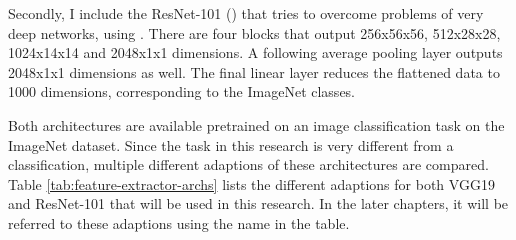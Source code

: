 Secondly, I include the ResNet-101 (\cite{He2016}) that tries to overcome problems of very deep networks, using .
There are four blocks that output 256x56x56, 512x28x28, 1024x14x14 and 2048x1x1 dimensions.
A following average pooling layer outputs 2048x1x1 dimensions as well.
The final linear layer reduces the flattened data to 1000 dimensions, corresponding to the ImageNet classes.

Both architectures are available pretrained on an image classification task on the ImageNet dataset.
Since the task in this research is very different from a classification, multiple different adaptions of these architectures are compared. 
Table \ref*{tab:feature-extractor-archs} lists the different adaptions for both VGG19 and ResNet-101 that will be used in this research.
In the later chapters, it will be referred to these adaptions using the name in the table.

